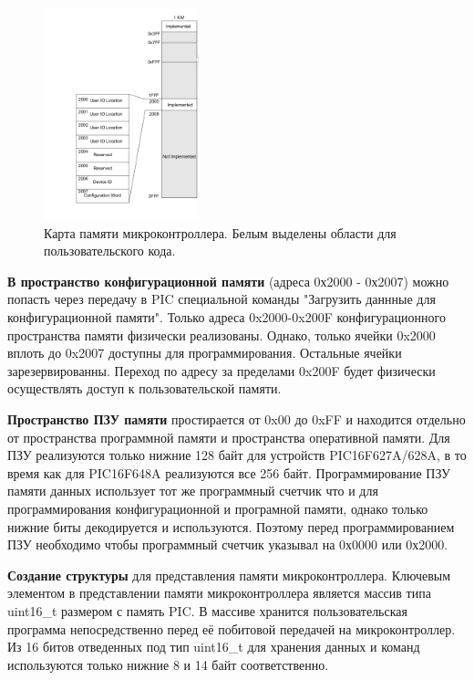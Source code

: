 \begin{figure}[h!]
    \centering
    \includegraphics[width=0.4\textwidth]{2017-05-08_at_02:27:50_screenshot.png}
    \caption{Карта памяти микроконтроллера. Белым выделены области для пользовательского кода.}
\end{figure}

\textbf{В пространство конфигурационной памяти}
(адреса 0х2000 - 0х2007) можно попасть через передачу в PIC специальной команды 
"Загрузить даннные для конфигурационной памяти". Только адреса 0x2000-0x200F 
конфигурационного пространства памяти физически реализованы. Однако, только 
ячейки 0x2000 вплоть до 0x2007 доступны для программирования. Остальные ячейки
зарезервированны. Переход по адресу за пределами 0x200F будет физически осуществлять
доступ к пользовательской памяти.

\textbf{Пространство ПЗУ памяти}
простирается от 0x00 до 0xFF и находится отдельно от пространства программной памяти
и пространства оперативной памяти. Для ПЗУ реализуются только нижние 128 байт
для устройств PIC16F627A/628A, в то время как для PIC16F648A
реализуются все 256 байт. Программирование ПЗУ памяти данных использует тот же программный счетчик
что и для программирования конфигурационной и програмной памяти, однако только нижние биты
декодируется и используются. Поэтому перед программированием ПЗУ необходимо чтобы 
программный счетчик указывал на 0х0000 или 0х2000.

\textbf{Создание структуры} для представления памяти микроконтроллера. 
Ключевым элементом в представлении памяти микроконтроллера является массив 
типа uint16\_t размером с память PIC. В массиве хранится пользовательская программа 
непосредственно перед её побитовой передачей на микроконтроллер. Из 16 битов отведенных под тип uint16\_t для 
хранения данных и команд используются только нижние 8 и 14 байт соответственно.


